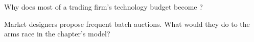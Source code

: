 \begin{interviewq}\label{iq:fm:technology-strategy:5}
Why does most of a trading firm's technology budget become ?
\end{interviewq}

\begin{interviewq}\label{iq:fm:technology-strategy:6}
Market designers propose frequent batch auctions. What would they do to the arms race in the chapter's model?
\end{interviewq}
